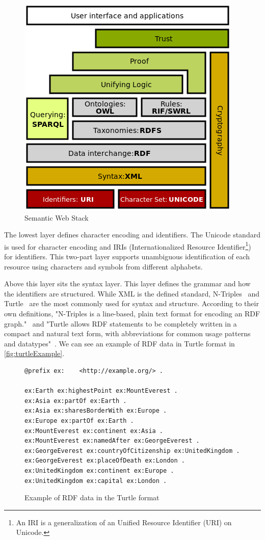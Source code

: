 \begin{figure}[H]
    \centering
        \includegraphics[width=.5\linewidth]{imagenes/Semantic_web_stack.png}
        \caption{Semantic Web Stack \cite{SemanticWebWikipedia}}
        \label{fig:semanticWebStack}
\end{figure}

The lowest layer defines character encoding and identifiers. The Unicode standard is used for character encoding and IRIs (Internationalized Resource Identifier\footnote{An IRI is a generalization of an Unified Resource Identifier (URI) on Unicode.}) for identifiers. This two-part layer supports unambiguous identification of each resource using characters and symbols from different alphabets.

Above this layer sits the syntax layer. This layer defines the grammar and how the identifiers are structured. While XML is the defined standard, N-Triples~\cite{nTriples} and Turtle~\cite{Turtle}  are the most commonly used for syntax and structure. According to their own definitions, "N-Triples is a line-based, plain text format for encoding an RDF graph."~\cite{nTriples} and "Turtle allows RDF statements to be completely written in a compact and natural text form, with abbreviations for common usage patterns and datatypes"~\cite{Turtle}. We can see an example of RDF data in Turtle format in \autoref{fig:turtleExample}. 

\begin{figure}[H]
\begin{verbatim}
@prefix ex:    <http://example.org/> .

ex:Earth ex:highestPoint ex:MountEverest .
ex:Asia ex:partOf ex:Earth .
ex:Asia ex:sharesBorderWith ex:Europe .
ex:Europe ex:partOf ex:Earth .
ex:MountEverest ex:continent ex:Asia .
ex:MountEverest ex:namedAfter ex:GeorgeEverest .
ex:GeorgeEverest ex:countryOfCitizenship ex:UnitedKingdom .
ex:GeorgeEverest ex:placeOfDeath ex:London .
ex:UnitedKingdom ex:continent ex:Europe .
ex:UnitedKingdom ex:capital ex:London .
\end{verbatim}
\caption{Example of RDF data in the Turtle format}
\label{fig:turtleExample}
\end{figure}

